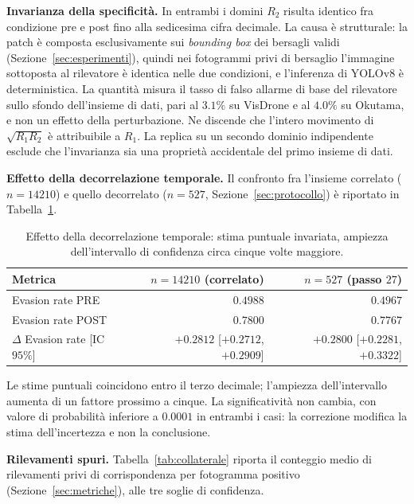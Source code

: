 \documentclass[a4paper,12pt]{report}
\begin{document}
\textbf{Invarianza della specificità.}
\label{sec:r2_invariante}
In entrambi i domini $R_2$ risulta identico fra condizione pre e post fino alla sedicesima cifra decimale. La causa è strutturale: la patch è composta esclusivamente sui \textit{bounding box} dei bersagli validi (Sezione~\ref{sec:esperimenti}), quindi nei fotogrammi privi di bersaglio l'immagine sottoposta al rilevatore è identica nelle due condizioni, e l'inferenza di YOLOv8 è deterministica. La quantità misura il tasso di falso allarme di base del rilevatore sullo sfondo dell'insieme di dati, pari al $3.1\%$ su VisDrone e al $4.0\%$ su Okutama, e non un effetto della perturbazione. Ne discende che l'intero movimento di $\sqrt{R_1 R_2}$ è attribuibile a $R_1$. La replica su un secondo dominio indipendente esclude che l'invarianza sia una proprietà accidentale del primo insieme di dati.

\textbf{Effetto della decorrelazione temporale.}
\label{sec:risultato_decorrelazione}
Il confronto fra l'insieme correlato ($n = 14210$) e quello decorrelato ($n = 527$, Sezione~\ref{sec:protocollo}) è riportato in Tabella~\ref{tab:decorrelazione}.

\begin{table}[t]
\centering
\begin{tabular}{lrr}
\toprule
Metrica & $n = 14210$ (correlato) & $n = 527$ (passo $27$) \\
\midrule
Evasion rate PRE & $0.4988$ & $0.4967$ \\
Evasion rate POST & $0.7800$ & $0.7767$ \\
$\Delta$ Evasion rate [IC $95\%$] & $+0.2812$ [$+0.2712$, $+0.2909$] & $+0.2800$ [$+0.2281$, $+0.3322$] \\
\bottomrule
\end{tabular}
\caption{Effetto della decorrelazione temporale: stima puntuale invariata, ampiezza dell'intervallo di confidenza circa cinque volte maggiore.}
\label{tab:decorrelazione}
\end{table}

Le stime puntuali coincidono entro il terzo decimale; l'ampiezza dell'intervallo aumenta di un fattore prossimo a cinque. La significatività non cambia, con valore di probabilità inferiore a $0.0001$ in entrambi i casi: la correzione modifica la stima dell'incertezza e non la conclusione.

\textbf{Rilevamenti spuri.}
\label{sec:risultato_collaterale}
Tabella~\ref{tab:collaterale} riporta il conteggio medio di rilevamenti privi di corrispondenza per fotogramma positivo (Sezione~\ref{sec:metriche}), alle tre soglie di confidenza.
\end{document}
